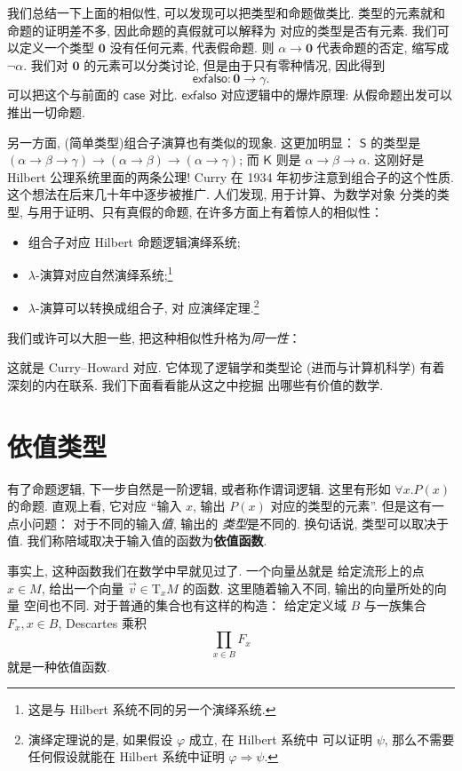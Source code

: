 \documentclass[UTF8]{ctexbook}
\newcommand{\cons}[1]{\textsf{#1}}
\newcommand{\slogan}[1]{\begin{center}%
  \fcolorbox{red!80!green}{red!10}{%
    \large\textbf{#1}%
  }%
\end{center}}  %
\theoremstyle{plain}
\theoremstyle{definition}
\theoremstyle{remark}
\begin{document}
我们总结一下上面的相似性, 可以发现可以把类型和命题做类比.
类型的元素就和命题的证明差不多, 因此命题的真假就可以解释为
对应的类型是否有元素. 我们可以定义一个类型 \(\mathbf 0\)
没有任何元素, 代表假命题. 则 \(\alpha \to \mathbf 0\)
代表命题的否定, 缩写成 \(\neg \alpha\). 我们对 \(\mathbf 0\)
的元素可以分类讨论, 但是由于只有零种情况, 因此得到
\[\cons{exfalso} : \mathbf 0 \to \gamma.\]
可以把这个与前面的 \(\cons{case}\) 对比. \(\cons{exfalso}\)
对应逻辑中的爆炸原理: 从假命题出发可以推出一切命题.

另一方面, (简单类型)组合子演算也有类似的现象. 这更加明显：
\(\cons{S}\) 的类型是 \((\alpha \to\beta\to\gamma)\to(\alpha\to\beta)\to(\alpha\to\gamma)\);
而 \(\cons{K}\) 则是 \(\alpha \to \beta \to \alpha\).
这刚好是 Hilbert 公理系统里面的两条公理! Curry 在
1934 年初步注意到组合子的这个性质\cite{curry:1934:combinatorCH}.
这个想法在后来几十年中逐步被推广. 人们发现, 用于计算、为数学对象
分类的类型, 与用于证明、只有真假的命题, 在许多方面上有着惊人的相似性：
\begin{itemize}
\item 组合子对应 Hilbert 命题逻辑演绎系统;
\item \(\lambda\)-演算对应自然演绎系统;\footnote{这是与 Hilbert 系统不同的另一个演绎系统.}
\item \(\lambda\)-演算可以转换成组合子, 对
应演绎定理.\footnote{演绎定理说的是,
如果假设 \(\varphi\) 成立, 在 Hilbert 系统中
可以证明 \(\psi\), 那么不需要任何假设就能在 Hilbert
系统中证明 \(\varphi \Rightarrow \psi\).}
\end{itemize}

我们或许可以大胆一些, 把这种相似性升格为\emph{同一性}：

\slogan{类型是命题.}

这就是 Curry--Howard 对应. 它体现了逻辑学和类型论
(进而与计算机科学) 有着深刻的内在联系.
我们下面看看能从这之中挖掘
出哪些有价值的数学.

\section{依值类型}

有了命题逻辑, 下一步自然是一阶逻辑, 或者称作谓词逻辑.
这里有形如 \(\forall x. P(x)\) 的命题. 直观上看,
它对应 “输入 \(x\), 输出 \(P(x)\) 对应的类型的元素”.
但是这有一点小问题： 对于不同的输入\emph{值}, 输出的%
\emph{类型}是不同的. 换句话说, 类型可以取决于值.
我们称陪域取决于输入值的函数为\textbf{依值函数}.

事实上, 这种函数我们在数学中早就见过了. 一个向量丛就是
给定流形上的点 \(x \in M\), 给出一个向量 \(\vec v \in \mathrm{T}_xM\)
的函数. 这里随着输入不同, 输出的向量所处的向量
空间也不同. 对于普通的集合也有这样的构造： 给定定义域 \(B\)
与一族集合 \(F_x, x \in B\), Descartes 乘积
\[\prod_{x\in B} F_x\]
就是一种依值函数.
\end{document}
